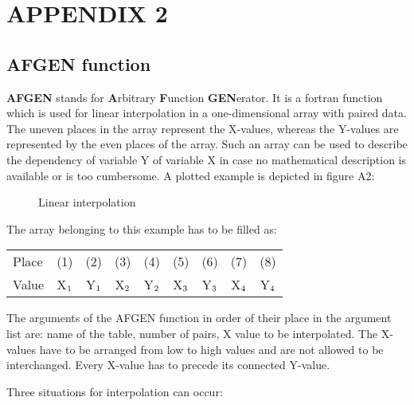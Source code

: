 \chapter*{APPENDIX 2} 

\section*{AFGEN function}

{\bf AFGEN} stands for {\bf A}rbitrary {\bf F}unction {\bf GEN}erator. It is a fortran function 
which is used for
linear interpolation in a one-dimensional array with paired data. The uneven places in the
array represent the X-values, whereas the Y-values are represented by the even places of the
array. Such an array can be used to describe the dependency of variable Y of variable X in
case no mathematical description is available or is too cumbersome. A plotted example is
depicted in figure A2:

\begin{figure}[htbp]
 \centering
 \caption{Linear interpolation}
 \label{fig:afgen}    
\end{figure}

The array belonging to this example has to be filled as:\\

\begin{center}
\begin{tabular}{lcccccccc}
Place & (1)& (2)& (3)& (4)& (5)& (6)& (7)& (8)\\
Value & X$_{{\rm 1}}$ & Y$_{{\rm 1}}$   & X$_{{\rm 2}}$& Y$_{{\rm 2}}$   & X$_{{\rm 3}}$ & Y$_{{\rm 3}}$   & X$_{{\rm 4}}$ & Y$_{{\rm 4}}$\\
\end{tabular}
\end{center}

The arguments of the AFGEN function in order of their place in the argument list are: name
of the table, number of pairs, X value to be interpolated. The X-values have to be arranged
from low to high values and are not allowed to be interchanged. Every X-value has to
precede its connected Y-value.

Three situations for interpolation can occur:

